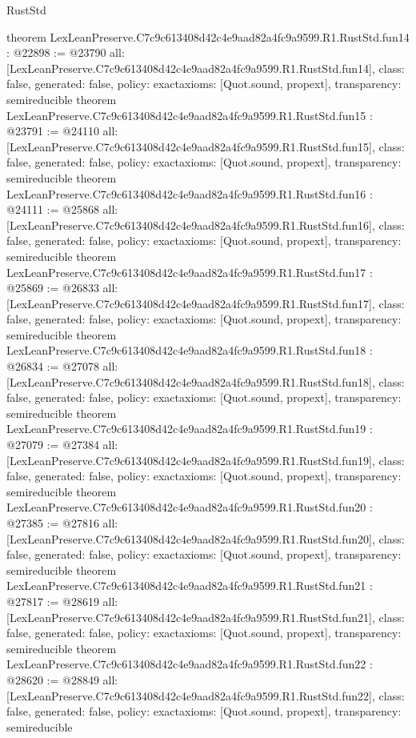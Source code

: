 \begin{lexlean}{RustStd}
\begin{coremodule}
{}
theorem LexLeanPreserve.C7c9c613408d42c4e9aad82a4fc9a9599.R1.RustStd.fun14 : @22898 := @23790 {
  all: [LexLeanPreserve.C7c9c613408d42c4e9aad82a4fc9a9599.R1.RustStd.fun14],
  class: false,
  generated: false,
  policy: exact{axioms: [Quot.sound, propext]},
  transparency: semireducible
}
theorem LexLeanPreserve.C7c9c613408d42c4e9aad82a4fc9a9599.R1.RustStd.fun15 : @23791 := @24110 {
  all: [LexLeanPreserve.C7c9c613408d42c4e9aad82a4fc9a9599.R1.RustStd.fun15],
  class: false,
  generated: false,
  policy: exact{axioms: [Quot.sound, propext]},
  transparency: semireducible
}
theorem LexLeanPreserve.C7c9c613408d42c4e9aad82a4fc9a9599.R1.RustStd.fun16 : @24111 := @25868 {
  all: [LexLeanPreserve.C7c9c613408d42c4e9aad82a4fc9a9599.R1.RustStd.fun16],
  class: false,
  generated: false,
  policy: exact{axioms: [Quot.sound, propext]},
  transparency: semireducible
}
theorem LexLeanPreserve.C7c9c613408d42c4e9aad82a4fc9a9599.R1.RustStd.fun17 : @25869 := @26833 {
  all: [LexLeanPreserve.C7c9c613408d42c4e9aad82a4fc9a9599.R1.RustStd.fun17],
  class: false,
  generated: false,
  policy: exact{axioms: [Quot.sound, propext]},
  transparency: semireducible
}
theorem LexLeanPreserve.C7c9c613408d42c4e9aad82a4fc9a9599.R1.RustStd.fun18 : @26834 := @27078 {
  all: [LexLeanPreserve.C7c9c613408d42c4e9aad82a4fc9a9599.R1.RustStd.fun18],
  class: false,
  generated: false,
  policy: exact{axioms: [Quot.sound, propext]},
  transparency: semireducible
}
theorem LexLeanPreserve.C7c9c613408d42c4e9aad82a4fc9a9599.R1.RustStd.fun19 : @27079 := @27384 {
  all: [LexLeanPreserve.C7c9c613408d42c4e9aad82a4fc9a9599.R1.RustStd.fun19],
  class: false,
  generated: false,
  policy: exact{axioms: [Quot.sound, propext]},
  transparency: semireducible
}
theorem LexLeanPreserve.C7c9c613408d42c4e9aad82a4fc9a9599.R1.RustStd.fun20 : @27385 := @27816 {
  all: [LexLeanPreserve.C7c9c613408d42c4e9aad82a4fc9a9599.R1.RustStd.fun20],
  class: false,
  generated: false,
  policy: exact{axioms: [Quot.sound, propext]},
  transparency: semireducible
}
theorem LexLeanPreserve.C7c9c613408d42c4e9aad82a4fc9a9599.R1.RustStd.fun21 : @27817 := @28619 {
  all: [LexLeanPreserve.C7c9c613408d42c4e9aad82a4fc9a9599.R1.RustStd.fun21],
  class: false,
  generated: false,
  policy: exact{axioms: [Quot.sound, propext]},
  transparency: semireducible
}
theorem LexLeanPreserve.C7c9c613408d42c4e9aad82a4fc9a9599.R1.RustStd.fun22 : @28620 := @28849 {
  all: [LexLeanPreserve.C7c9c613408d42c4e9aad82a4fc9a9599.R1.RustStd.fun22],
  class: false,
  generated: false,
  policy: exact{axioms: [Quot.sound, propext]},
  transparency: semireducible
}
\end{coremodule}
\end{lexlean}

